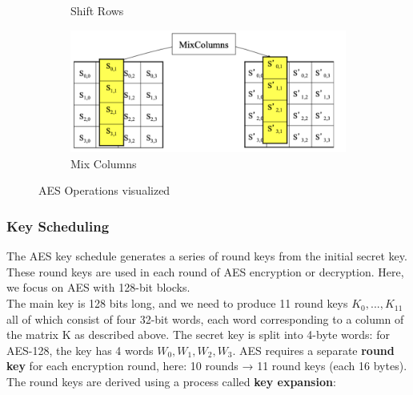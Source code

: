 \begin{figure}[h!]
\begin{subfigure}[t]{0.45\textwidth}
        \caption{Shift Rows}
    \end{subfigure}
    \hfill
    \begin{subfigure}[t]{0.45\textwidth}
        \centering
        \includegraphics[width=\textwidth]{img/mixcolumns.png}
        \caption{Mix Columns}
    \end{subfigure}
    \caption{AES Operations visualized}
    \label{fig:aes-operations}
\end{figure}

\subsubsection{Key Scheduling}
The AES key schedule generates a series of round keys from the initial secret key. These round keys are used in each round of AES encryption or decryption. Here, we focus on AES with 128-bit blocks. \\


The main key is 128 bits long, and we need to produce 11 round keys $K_0,...,K_{11}$ all of which consist of four 32-bit words, each word corresponding to a column of the matrix K as described above.
The secret key is split into 4-byte words: for AES-128, the key has 4 words \( W_0, W_1, W_2, W_3 \). 
AES requires a separate \textbf{round key} for each encryption round, here: 10 rounds → 11 round keys (each 16 bytes). The round keys are derived using a process called \textbf{key expansion}:

